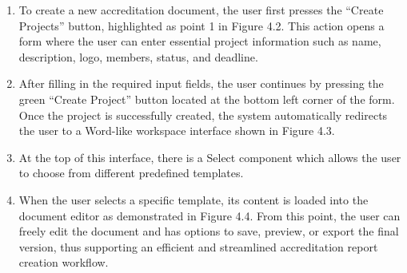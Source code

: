 \begin{enumerate}
    \item To create a new accreditation document, the user first presses the “Create Projects” button, highlighted as point 1 in Figure 4.2. This action opens a form where the user can enter essential project information such as name, description, logo, members, status, and deadline.  
    \item After filling in the required input fields, the user continues by pressing the green “Create Project” button located at the bottom left corner of the form. Once the project is successfully created, the system automatically redirects the user to a Word-like workspace interface shown in Figure 4.3.
    \item At the top of this interface, there is a Select component which allows the user to choose from different predefined templates.
    \item When the user selects a specific template, its content is loaded into the document editor as demonstrated in Figure 4.4. From this point, the user can freely edit the document and has options to save, preview, or export the final version, thus supporting an efficient and streamlined accreditation report creation workflow.
\end{enumerate}

